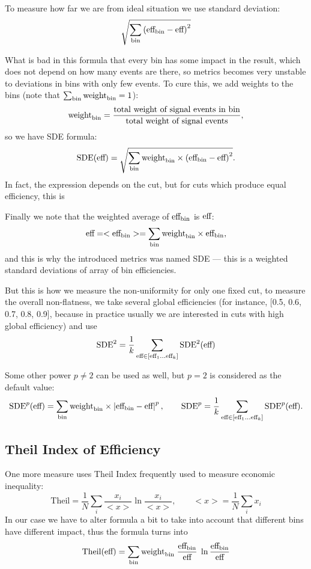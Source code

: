 \documentclass[12pt]{article}
\theoremstyle{definition}
\theoremstyle{remark}
\newcommand{\abs}[1]{\left\vert#1\right\vert}
\begin{document}
To measure how far we are from ideal situation we use standard deviation:
\[
	\sqrt{\sum_{\text{bin}} \left( \text{eff}_\text{bin} - \text{eff} \right)^2  }
\]

What is bad in this formula that every bin has some impact in the result, which does not depend on how many events are there, so metrics becomes very unstable to deviations in bins with only few events. To cure this, we add weights to the bins (note that $\sum_{\text{bin}} \text{weight}_\text{bin} = 1$):
\[
	\text{weight}_\text{bin} = \dfrac{\text{total weight of signal events in bin}}
		{\text{total weight of signal events}},
\]
so we have SDE formula:
\[
	\text{SDE}(\text{eff}) = 
	\sqrt{\sum_{\text{bin}} \text{weight}_\text{bin} \times \left(\text{eff}_\text{bin} - \text{eff} \right)^2}. 
\] 
In fact, the expression depends on the cut, but for cuts which produce equal efficiency, this is 


Finally we note that the weighted average of $\text{eff}_\text{bin}$ is $\text{eff}$:
\[
	\text{eff} = < \text{eff}_\text{bin} > =  \sum_{\text{bin}} \text{weight}_\text{bin} \times \text{eff}_\text{bin},
\]
and this is why the introduced metrics was named SDE --- this is a weighted standard deviations of array of bin efficiencies.

But this is how we measure the non-uniformity for only one fixed cut, to measure the overall non-flatness, we take several global efficiencies (for instance, [0.5, 0.6, 0.7, 0.8, 0.9], because in practice usually we are interested in cuts with high global efficiency) and use 
\[
	\text{SDE}^2  =  \frac{1}{k} 
	\sum_{\text{eff} \in [\text{eff}_1 \dots \text{eff}_k] }  
		\text{SDE}^2(\text{eff})
\]

Some other power $p \neq 2$ can be used as well, but $p=2$ is considered as the default value: 
\[
	\SDE^p(\globaleff) = 
	\sum_{\bin} \binweight \times \abs{\bineff - \globaleff}^p,
\qquad
	\SDE^p  =  \frac{1}{k} 
	\sum_{\globaleff \in [\globaleff_1 \dots \globaleff_k] }  
		\text{SDE}^p(\globaleff).
\]



\subsection{Theil Index of Efficiency}
\def\theil{\text{Theil}}

One more measure uses Theil Index frequently used to measure economic inequality:
\[
	\theil = \frac{1}{N} \sum_i \frac{x_i}{<x>} \ln{\frac{x_i}{<x>}}, 
		\qquad <x> = \frac{1}{N} \sum_i x_i
\]
In our case we have to alter formula a bit to take into account that different bins have different impact, thus the formula turns into
\[
	\theil(\globaleff) = \sum_\bin \binweight \; \frac{\bineff}{\globaleff} \; \ln{\frac{\bineff}{\globaleff}}
\]
\end{document}
